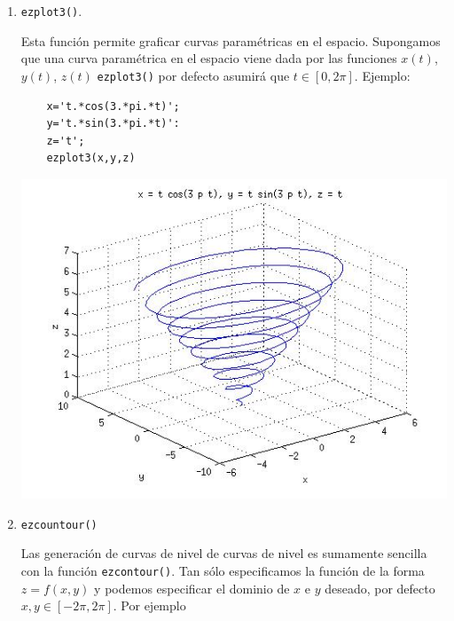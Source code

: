 \documentclass[11pt]{article}
\begin{document}
\begin{enumerate}
 \item \texttt{ezplot3()}.
 
 Esta funci\'on permite graficar curvas param\'etricas en el espacio. Supongamos que 
 una curva param\'etrica en el espacio viene dada por las funciones $x(t)$, $y(t)$, $z(t)$ 
 \texttt{ezplot3()} por defecto asumir\'a que $t\in[0,2\pi]$. Ejemplo:

\begin{minipage}{0.4\textwidth}
      \begin{verbatim}
	x='t.*cos(3.*pi.*t)';
	y='t.*sin(3.*pi.*t)':
	z='t';
	ezplot3(x,y,z)
      \end{verbatim}
\end{minipage}
\begin{minipage}{0.5\textwidth}
      \begin{center}
      \includegraphics[width=\textwidth]{./ej1.jpg}
      \end{center}
\end{minipage}

\item \texttt{ezcountour()}

Las generaci\'on de curvas de nivel de curvas de nivel es sumamente sencilla 
con la funci\'on \texttt{ezcontour()}. Tan s\'olo especificamos la funci\'on 
de la forma $z=f(x,y)$ y podemos especificar el dominio de $x$ e $y$ deseado, por defecto 
$x,y\in [-2\pi,2\pi]$. Por ejemplo


\end{enumerate}
\end{document}
